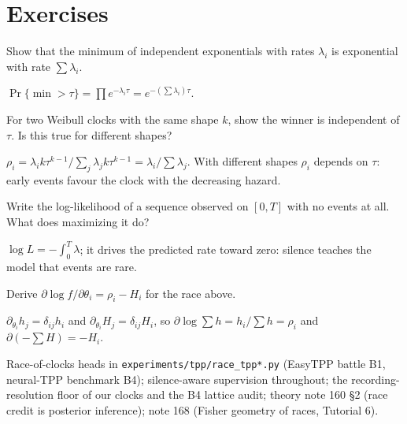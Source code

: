 \documentclass[11pt]{article}
\begin{document}
\section*{Exercises}
\begin{exercise} Show that the minimum of independent exponentials with rates $\lambda_i$ is exponential with rate $\sum\lambda_i$.\end{exercise}
\begin{solution} $\Pr\{\min>\tau\}=\prod e^{-\lambda_i\tau}=e^{-(\sum\lambda_i)\tau}$.\end{solution}
\begin{exercise} For two Weibull clocks with the same shape $k$, show the winner is independent of $\tau$. Is this true for different shapes?\end{exercise}
\begin{solution} $\rho_i=\lambda_i k\tau^{k-1}/\sum_j\lambda_j k\tau^{k-1}=\lambda_i/\sum\lambda_j$. With different shapes $\rho_i$ depends on $\tau$:
early events favour the clock with the decreasing hazard.\end{solution}
\begin{exercise} Write the log-likelihood of a sequence observed on $[0,T]$ with no events at all. What does maximizing it do?\end{exercise}
\begin{solution} $\log L=-\int_0^T\lambda$; it drives the predicted rate toward zero: silence teaches the model that events are rare.\end{solution}
\begin{exercise} Derive $\partial\log f/\partial\theta_i=\rho_i-H_i$ for the race above.\end{exercise}
\begin{solution} $\partial_{\theta_i}h_j=\delta_{ij}h_i$ and $\partial_{\theta_i}H_j=\delta_{ij}H_i$, so $\partial\log\sum h=h_i/\sum h=\rho_i$ and $\partial(-\sum H)=-H_i$.\end{solution}

\begin{inourmodels}
Race-of-clocks heads in \texttt{experiments/tpp/race\_tpp*.py} (EasyTPP battle B1, neural-TPP benchmark B4); silence-aware
supervision throughout; the recording-resolution floor of our clocks and the B4 lattice audit; theory note 160 \S2 (race credit is
posterior inference); note 168 (Fisher geometry of races, Tutorial 6).
\end{inourmodels}
\end{document}

